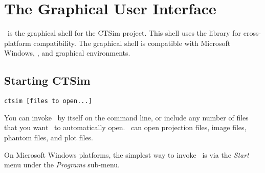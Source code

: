 \chapter{The Graphical User Interface}\label{ctsim}%
%
\ctsimfooter%


\ctsim\ is the graphical shell for the CTSim project. This shell uses
the  library for
cross-platform compatibility. The graphical shell is compatible with
Microsoft Windows, , and
 graphical environments.

\section{Starting CTSim}
\usage \texttt{ctsim [files to open...]}

You can invoke \ctsim\ by itself on the command line, or include any
number of files that you want \ctsim\ to automatically open. \ctsim\
can open projection files, image files, phantom files, and plot files.

On Microsoft Windows platforms, the simplest way to invoke \ctsim\ is
via the \emph{Start} menu under the \emph{Programs} sub-menu.

